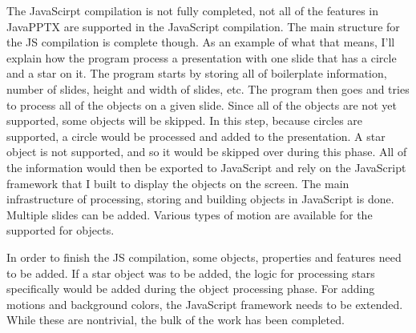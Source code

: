 \documentclass[12pt,twoside]{reedthesis}
\begin{document}
The JavaScirpt compilation is not fully completed, not all of the features in JavaPPTX are supported in the JavaScript compilation. The main structure for the JS compilation is complete though. As an example of what that means, I'll explain how the program process a presentation with one slide that has a circle and a star on it. The program starts by storing all of boilerplate information, number of slides, height and width of slides, etc. The program then goes and tries to process all of the objects on a given slide. Since all of the objects are not yet supported, some objects will be skipped. In this step, because circles are supported, a circle would be processed and added to the presentation. A star object is not supported, and so it would be skipped over during this phase. All of the information would then be exported to JavaScript and rely on the JavaScript framework that I built to display the objects on the screen. The main infrastructure of processing, storing and building objects in JavaScript is done. Multiple slides can be added. Various types of motion are available for the supported for objects. 

In order to finish the JS compilation, some objects, properties and features need to be added. If a star object was to be added, the logic for processing stars specifically would be added during the object processing phase. For adding motions and background colors, the JavaScript framework needs to be extended. While these are nontrivial, the bulk of the work has been completed. 
\end{document}
